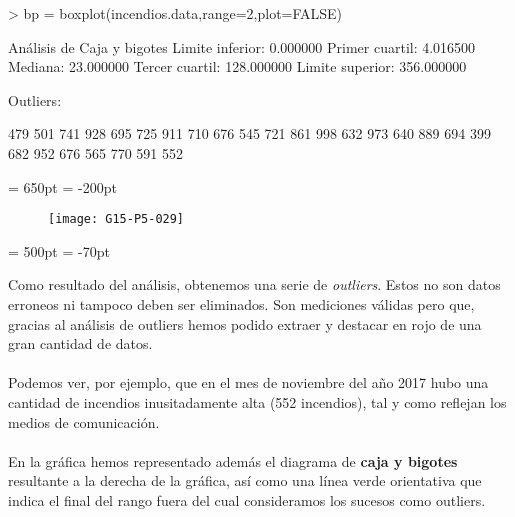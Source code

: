 \documentclass [a4paper] {article}
\begin{document}
\begin{Schunk}
\begin{Sinput}
> bp = boxplot(incendios.data,range=2,plot=FALSE)
\end{Sinput}
\end{Schunk}
\begin{Schunk}
\begin{Soutput}
Análisis de Caja y bigotes
	Limite inferior: 0.000000
	Primer cuartil: 4.016500
	Mediana: 23.000000
	Tercer cuartil: 128.000000
	Limite superior: 356.000000

Outliers:
\end{Soutput}
\begin{Soutput}
479 501 741 928 695 725 911 710 676 545 721 861 998 632 973 640 889 694 399 682 
952 676 565 770 591 552
\end{Soutput}
\end{Schunk}


\textwidth = 650pt
\hoffset = -200pt
\begin{figure}[h!]
\centering
\begin{Schunk}
\end{Schunk}
\texttt{[image: G15-P5-029]}
\end{figure}
\textwidth = 500pt
\hoffset = -70pt

Como resultado del análisis, obtenemos una serie de \textit{outliers}. Estos no son datos erroneos ni 
tampoco deben ser eliminados. Son mediciones válidas pero que, gracias al análisis de outliers
hemos podido extraer y destacar en rojo de una gran cantidad de datos.
\\\\
Podemos ver, por ejemplo, que en el mes de noviembre del año 2017 hubo una cantidad de incendios
inusitadamente alta (552 incendios), tal y como reflejan los medios de comunicación.
\\\\
En la gráfica hemos representado además el diagrama de \textbf{caja y bigotes} resultante a la 
derecha de la gráfica, así como una línea verde orientativa que indica el final del rango fuera
del cual consideramos los sucesos como outliers.
\\\\
\end{document}
